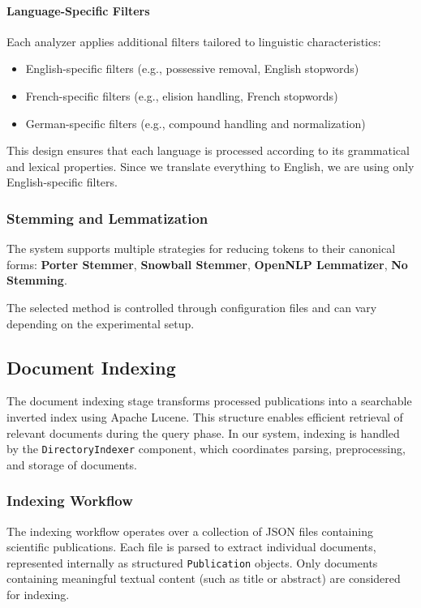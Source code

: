 \paragraph{Language-Specific Filters}

Each analyzer applies additional filters tailored to linguistic characteristics:

\begin{itemize}
    \item English-specific filters (e.g., possessive removal, English stopwords)
    \item French-specific filters (e.g., elision handling, French stopwords)
    \item German-specific filters (e.g., compound handling and normalization)
\end{itemize}

This design ensures that each language is processed according to its grammatical and lexical properties.
Since we translate everything to English, we are using only English-specific filters.

\subsubsection{Stemming and Lemmatization}

The system supports multiple strategies for reducing tokens to their canonical forms: \textbf{Porter Stemmer}, \textbf{Snowball Stemmer}, \textbf{OpenNLP Lemmatizer}, \textbf{No Stemming}.

The selected method is controlled through configuration files and can vary depending on the experimental setup.

\subsection{Document Indexing}

The document indexing stage transforms processed publications into a searchable inverted index using Apache Lucene. This structure enables efficient retrieval of relevant documents during the query phase. In our system, indexing is handled by the \texttt{DirectoryIndexer} component, which coordinates parsing, preprocessing, and storage of documents.

\subsubsection{Indexing Workflow}

The indexing workflow operates over a collection of JSON files containing scientific publications. Each file is parsed to extract individual documents, represented internally as structured \texttt{Publication} objects. Only documents containing meaningful textual content (such as title or abstract) are considered for indexing.

